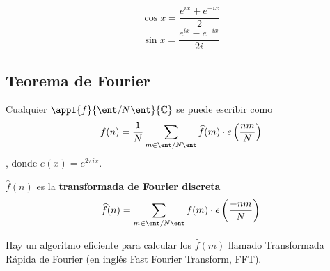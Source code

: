 	$$\cos x = \frac{e^{ix} + e^{-ix}}{2}$$
	$$\sin x = \frac{e^{ix} - e^{-ix}}{2i}$$

\subsection{Teorema de Fourier}

\begin{theorem}

	Cualquier $\appl{f}{\ent/N\ent}{\mathbb{C}}$ se puede escribir como
	\[
		f(n) = \frac{1}{N}\sum_{m\in \ent/N\ent}\widehat{f}(m)\cdot e\left(\frac{nm}{N}\right)
	\],
	donde $e(x) = e^{2\pi ix}$.

	$\widehat{f}(n)$ es la \textbf{transformada de Fourier discreta}
	$$\widehat{f}(n) = \sum_{m\in \ent/N\ent}f(m)\cdot e\left(\frac{-nm}{N}\right)$$

\end{theorem}
\obs Hay un algoritmo eficiente para calcular los $\widehat{f}(m)$ llamado Transformada Rápida de Fourier (en inglés Fast Fourier Transform, FFT).

